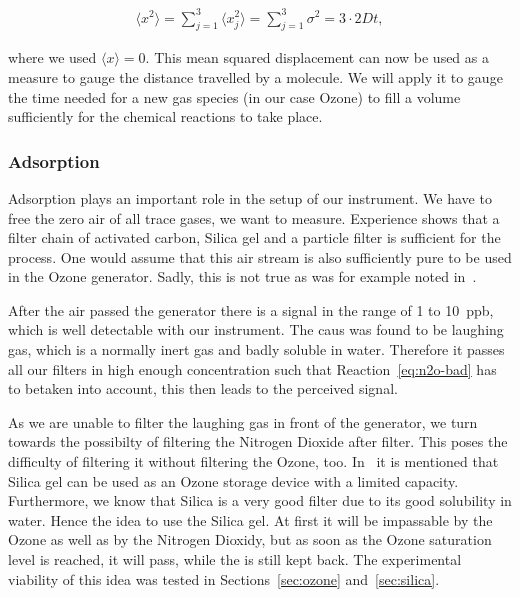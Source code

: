 \begin{align}
  \langle x^2 \rangle = \sum_{j=1}^3 \langle
  x_j^2 \rangle = \sum_{j=1}^3 \sigma^2 = 3 \cdot 2Dt, \label{eq:mqd}
\end{align}

where we used $\langle x \rangle = 0$. This mean squared displacement
can now be used as a measure to gauge the distance travelled by a
molecule. We will apply it to gauge the time needed for a new gas
species (in our case Ozone) to fill a volume sufficiently for the
chemical reactions to take place.

\subsubsection{Adsorption}
\label{sec:adsorption}

Adsorption plays an important role in the setup of our
instrument. We have to free the zero air of all trace gases, we want
to measure. Experience shows that a filter chain of activated carbon,
Silica gel and a particle filter is sufficient for the process. One
would assume that this air stream is also sufficiently pure to be used
in the Ozone generator. Sadly, this is not true as was for example
noted in~\cite{bsc}. 

After the air passed the generator there is a  signal in the
range of \num{1} to \SI{10}{ppb}, which is well detectable with our
instrument. The caus was found to be laughing gas, which is a normally
inert gas and badly soluble in water. Therefore it passes all our
filters in high enough concentration such that
Reaction~\eqref{eq:n2o-bad} has to betaken into account, this 
then leads to the perceived  signal. 

As we are unable to filter the laughing gas in front of the generator,
we turn towards the possibilty of filtering the Nitrogen Dioxide after
filter. This poses the difficulty of filtering it without filtering
the Ozone, too. In~\cite{ozone-silica} it is mentioned that Silica gel
can be used as an Ozone storage device with a limited
capacity. Furthermore, we know that Silica is a very good 
filter due to its good solubility in water. Hence the idea to use the
Silica gel. At first it will be impassable by the Ozone as well as by
the Nitrogen Dioxidy, but as soon as the Ozone saturation level is
reached, it will pass, while the  is still kept back. The
experimental viability of this idea was tested in
Sections~\ref{sec:ozone} and~\ref{sec:silica}.

